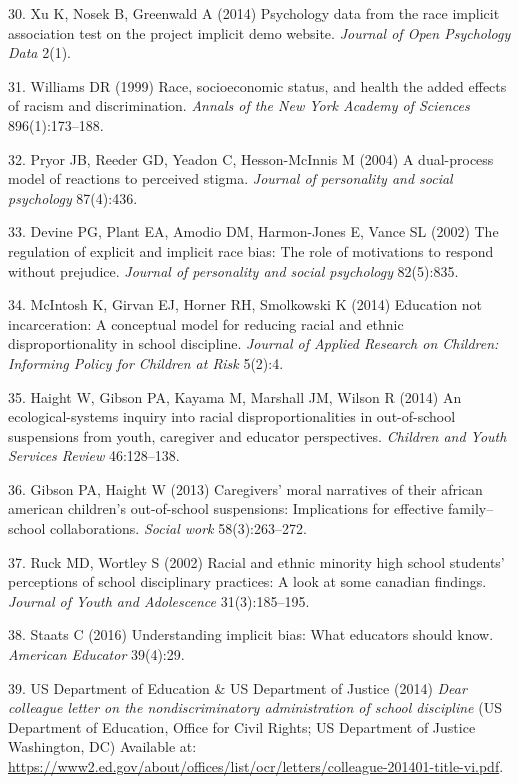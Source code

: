 \documentclass[9pt,twocolumn,twoside,lineno]{pnas-new}
\begin{document}
\hypertarget{ref-xu2014psychology}{}
30. Xu K, Nosek B, Greenwald A (2014) Psychology data from the race
implicit association test on the project implicit demo website.
\emph{Journal of Open Psychology Data} 2(1).

\hypertarget{ref-williams1999race}{}
31. Williams DR (1999) Race, socioeconomic status, and health the added
effects of racism and discrimination. \emph{Annals of the New York
Academy of Sciences} 896(1):173--188.

\hypertarget{ref-pryor2004dual}{}
32. Pryor JB, Reeder GD, Yeadon C, Hesson-McInnis M (2004) A
dual-process model of reactions to perceived stigma. \emph{Journal of
personality and social psychology} 87(4):436.

\hypertarget{ref-devine2002regulation}{}
33. Devine PG, Plant EA, Amodio DM, Harmon-Jones E, Vance SL (2002) The
regulation of explicit and implicit race bias: The role of motivations
to respond without prejudice. \emph{Journal of personality and social
psychology} 82(5):835.

\hypertarget{ref-mcintosh2014education}{}
34. McIntosh K, Girvan EJ, Horner RH, Smolkowski K (2014) Education not
incarceration: A conceptual model for reducing racial and ethnic
disproportionality in school discipline. \emph{Journal of Applied
Research on Children: Informing Policy for Children at Risk} 5(2):4.

\hypertarget{ref-haight2014ecological}{}
35. Haight W, Gibson PA, Kayama M, Marshall JM, Wilson R (2014) An
ecological-systems inquiry into racial disproportionalities in
out-of-school suspensions from youth, caregiver and educator
perspectives. \emph{Children and Youth Services Review} 46:128--138.

\hypertarget{ref-gibson2013caregivers}{}
36. Gibson PA, Haight W (2013) Caregivers' moral narratives of their
african american children's out-of-school suspensions: Implications for
effective family--school collaborations. \emph{Social work}
58(3):263--272.

\hypertarget{ref-ruck2002racial}{}
37. Ruck MD, Wortley S (2002) Racial and ethnic minority high school
students' perceptions of school disciplinary practices: A look at some
canadian findings. \emph{Journal of Youth and Adolescence}
31(3):185--195.

\hypertarget{ref-staats2016understanding}{}
38. Staats C (2016) Understanding implicit bias: What educators should
know. \emph{American Educator} 39(4):29.

\hypertarget{ref-us2014dear}{}
39. US Department of Education \& US Department of Justice (2014)
\emph{Dear colleague letter on the nondiscriminatory administration of
school discipline} (US Department of Education, Office for Civil Rights;
US Department of Justice Washington, DC) Available at:
\url{https://www2.ed.gov/about/offices/list/ocr/letters/colleague-201401-title-vi.pdf}.
\end{document}
